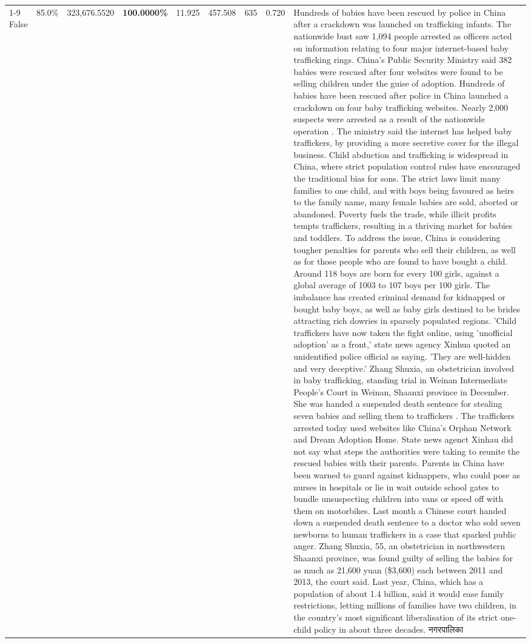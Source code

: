 \begin{table}[H]
\begin{tabular}{lllrlllll}
\cline{1-9}
False & 85.0\% & 323,676.5520 & \bfseries \color{red} 100.0000\% & 11.925 & 457.508 & 635 & 0.720 & Hundreds of babies have been rescued by police in China after a crackdown was launched on trafficking infants. The nationwide bust saw 1,094 people arrested as officers acted on information relating to four major internet-based baby trafficking rings. China's Public Security Ministry said 382 babies were rescued after four websites were found to be selling children under the guise of adoption. Hundreds of babies have been rescued after police in China launched a crackdown on four baby trafficking websites. Nearly 2,000 suspects were arrested as a result of the nationwide operation . The ministry said the internet has helped baby traffickers, by providing a more secretive cover for the illegal business. Child abduction and trafficking is widespread in China, where strict population control rules have encouraged the traditional bias for sons. The strict laws limit many families to one child, and with boys being favoured as heirs to the family name, many female babies are sold, aborted or abandoned. Poverty fuels the trade, while illicit profits tempts traffickers, resulting in a thriving market for babies and toddlers. To address the issue, China is considering tougher penalties for parents who sell their children, as well as for those people who are found to have bought a child. Around 118 boys are born for every 100 girls, against a global average of 1003 to 107 boys per 100 girls. The imbalance has created criminal demand for kidnapped or bought baby boys, as well as baby girls destined to be brides attracting rich dowries in sparsely populated regions. 'Child traffickers have now taken the fight online, using 'unofficial adoption' as a front,' state news agency Xinhua quoted an unidentified police official as saying. 'They are well-hidden and very deceptive.' Zhang Shuxia, an obstetrician involved in baby trafficking, standing trial in Weinan Intermediate People's Court in Weinan, Shaanxi province in December. She was handed a suspended death sentence for stealing seven babies and selling them to traffickers . The traffickers arrested today used websites like China's Orphan Network and Dream Adoption Home. State news agenct Xinhau did not say what steps the authorities were taking to reunite the rescued babies with their parents. Parents in China have been warned to guard against kidnappers, who could pose as nurses in hospitals or lie in wait outside school gates to bundle unsuspecting children into vans or speed off with them on motorbikes. Last month a Chinese court handed down a suspended death sentence to a doctor who sold seven newborns to human traffickers in a case that sparked public anger. Zhang Shuxia, 55, an obstetrician in northwestern Shaanxi province, was found guilty of selling the babies for as much as 21,600 yuan (\$3,600) each between 2011 and 2013, the court said. Last year, China, which has a population of about 1.4 billion, said it would ease family restrictions, letting millions of families have two children, in the country's most significant liberalisation of its strict one-child policy in about three decades. नगरपालिका \\

\end{tabular}
\end{table}

